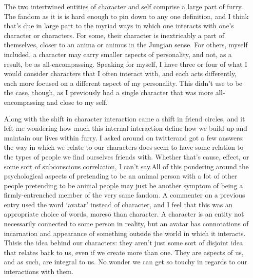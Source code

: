 The two intertwined entities of character and self comprise a large part of furry. The fandom as it is is hard enough to pin down to any one definition, and I think that's due in large part to the myriad ways in which one interacts with one's character or characters. For some, their character is inextricably a part of themselves, closer to an anima or animus in the Jungian sense. For others, myself included, a character may carry smaller aspects of personality, and not, as a result, be as all-encompassing. Speaking for myself, I have three or four of what I would consider characters that I often interact with, and each acts differently, each more focused on a different aspect of my personality. This didn't use to be the case, though, as I previously had a single character that was more all-encompassing and close to my self.

Along with the shift in character interaction came a shift in friend circles, and it left me wondering how much this internal interaction define how we build up and maintain our lives within furry. I asked around on twitterand got a few answers: the way in which we relate to our characters does seem to have some relation to the types of people we find ourselves friends with. Whether that's cause, effect, or some sort of subconscious correlation, I can't say.All of this pondering around the psychological aspects of pretending to be an animal person with a lot of other people pretending to be animal people may just be another symptom of being a firmly-entrenched member of the very same fandom. A commenter on a previous entry used the word `avatar' instead of character, and I feel that this was an appropriate choice of words, moreso than character. A character is an entity not necessarily connected to some person in reality, but an avatar has connotations of incarnation and appearance of something outside the world in which it interacts. Thisis the idea behind our characters: they aren't just some sort of disjoint idea that relates back to us, even if we create more than one. They are aspects of us, and as such, are integral to us. No wonder we can get so touchy in regards to our interactions with them.
